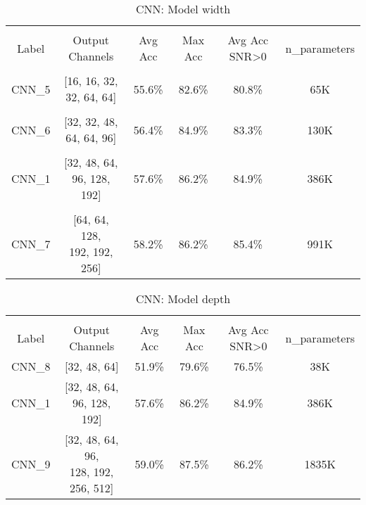 \begin{table}[h!]
\centering
\begin{tabular}{| c  c  c  c  c  c |} 
 \hline \\[-1em]
 Label & Output Channels & Avg Acc & Max Acc & Avg Acc SNR>0 & n\_parameters \\ [1ex]  \\[-1em]
    CNN\_5 & \makecell{[16, 16, 32, \\ 32, 64, 64]} & 55.6\% & 82.6\% & 80.8\% & 65K \\ [1ex]  \\[-1em]
    CNN\_6 & \makecell{[32, 32, 48, \\ 64, 64, 96]} & 56.4\% & 84.9\% & 83.3\% & 130K \\ [1ex]  \\[-1em]
    CNN\_1 & \makecell{[32, 48, 64, \\ 96, 128, 192]} & 57.6\% & 86.2\% & 84.9\% & 386K \\ [1ex]  \\[-1em]
    CNN\_7 & \makecell{[64, 64, 128, \\ 192, 192, 256]} & 58.2\% & 86.2\% & 85.4\% & 991K \\ [1ex]
 \hline
\end{tabular}
\caption{CNN: Model width}
\label{table:cnn_model_width}
\end{table}

\begin{table}[h!]
\centering
\begin{tabular}{| c  c  c  c  c  c |} 
 \hline \\[-1em]
 Label & Output Channels & Avg Acc & Max Acc & Avg Acc SNR>0 & n\_parameters \\ [1ex]
    CNN\_8 & [32, 48, 64] & 51.9\% & 79.6\% & 76.5\% & 38K \\ [1ex]
    CNN\_1 & \makecell{[32, 48, 64, \\ 96, 128, 192]} & 57.6\% & 86.2\% & 84.9\% & 386K \\ [1ex]
    CNN\_9 & \makecell{[32, 48, 64, 96, \\ 128, 192, 256, 512]} & 59.0\% & 87.5\% & 86.2\% & 1835K \\ [1ex]
\hline
\end{tabular}
\caption{CNN: Model depth}
\label{table:cnn_model_depth}
\end{table}


